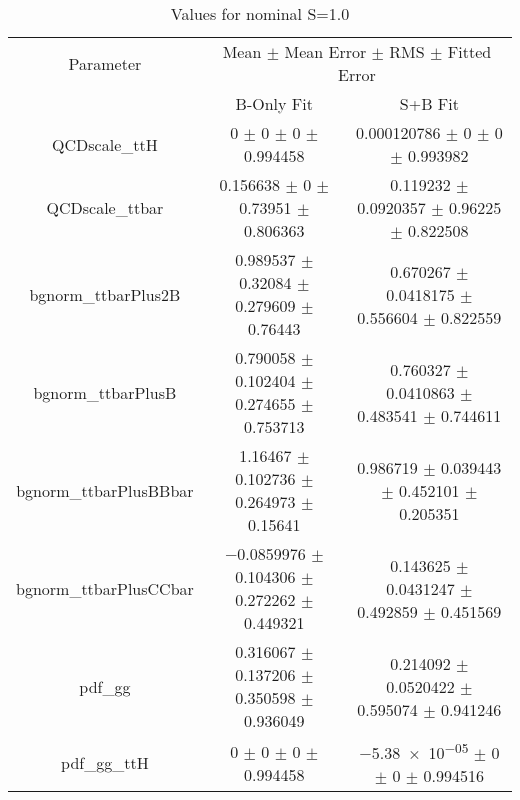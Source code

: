 \begin{table}
\centering
\caption{Values for nominal S=1.0}
\begin{tabular}{ccc}
\toprule
Parameter & \multicolumn{2}{c}{Mean $\pm$ Mean Error $\pm$ RMS $\pm$ Fitted Error}\\
 & B-Only Fit & S+B Fit\\
\midrule
QCDscale\_ttH & \num{0} $\pm$ \num{0} $\pm$ \num{0} $\pm$ \num{0.994458} & \num{0.000120786} $\pm$ \num{0} $\pm$ \num{0} $\pm$ \num{0.993982}\\
QCDscale\_ttbar & \num{0.156638} $\pm$ \num{0} $\pm$ \num{0.73951} $\pm$ \num{0.806363} & \num{0.119232} $\pm$ \num{0.0920357} $\pm$ \num{0.96225} $\pm$ \num{0.822508}\\
bgnorm\_ttbarPlus2B & \num{0.989537} $\pm$ \num{0.32084} $\pm$ \num{0.279609} $\pm$ \num{0.76443} & \num{0.670267} $\pm$ \num{0.0418175} $\pm$ \num{0.556604} $\pm$ \num{0.822559}\\
bgnorm\_ttbarPlusB & \num{0.790058} $\pm$ \num{0.102404} $\pm$ \num{0.274655} $\pm$ \num{0.753713} & \num{0.760327} $\pm$ \num{0.0410863} $\pm$ \num{0.483541} $\pm$ \num{0.744611}\\
bgnorm\_ttbarPlusBBbar & \num{1.16467} $\pm$ \num{0.102736} $\pm$ \num{0.264973} $\pm$ \num{0.15641} & \num{0.986719} $\pm$ \num{0.039443} $\pm$ \num{0.452101} $\pm$ \num{0.205351}\\
bgnorm\_ttbarPlusCCbar & \num{-0.0859976} $\pm$ \num{0.104306} $\pm$ \num{0.272262} $\pm$ \num{0.449321} & \num{0.143625} $\pm$ \num{0.0431247} $\pm$ \num{0.492859} $\pm$ \num{0.451569}\\
pdf\_gg & \num{0.316067} $\pm$ \num{0.137206} $\pm$ \num{0.350598} $\pm$ \num{0.936049} & \num{0.214092} $\pm$ \num{0.0520422} $\pm$ \num{0.595074} $\pm$ \num{0.941246}\\
pdf\_gg\_ttH & \num{0} $\pm$ \num{0} $\pm$ \num{0} $\pm$ \num{0.994458} & \num{-5.38e-05} $\pm$ \num{0} $\pm$ \num{0} $\pm$ \num{0.994516}\\
\bottomrule
\end{tabular}
\end{table}